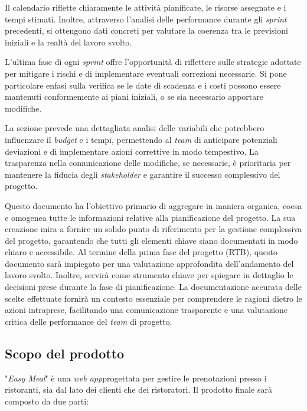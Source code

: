 \begin{itemize}
	      Il calendario riflette chiaramente le attività pianificate, le risorse assegnate
	      e i tempi stimati.
	      Inoltre, attraverso l'analisi delle performance durante gli \textit{sprint} precedenti,
	      si ottengono dati concreti per valutare la coerenza tra le previsioni iniziali
	      e la realtà del lavoro svolto.

	      L'ultima fase di ogni \textit{sprint} offre l'opportunità di riflettere sulle strategie
	      adottate per mitigare i rischi e di implementare eventuali correzioni necessarie.
	      Si pone particolare enfasi sulla verifica se le date di scadenza e i costi possono
	      essere mantenuti conformemente ai piani iniziali, o se sia necessario apportare modifiche.

	      La sezione prevede una dettagliata analisi delle variabili che potrebbero influenzare
	      il \textit{budget} e i tempi, permettendo al \textit{team} di anticipare potenziali deviazioni e di
	      implementare azioni correttive in modo tempestivo. La trasparenza nella comunicazione
	      delle modifiche, se necessarie, è prioritaria per mantenere la fiducia degli \textit{stakeholder}
	      e garantire il successo complessivo del progetto.
\end{itemize}
Questo documento ha l'obiettivo primario di aggregare in maniera organica, coesa e
omogenea tutte le informazioni relative alla pianificazione del progetto.
La sua creazione mira a fornire un solido punto di riferimento per la gestione complessiva del progetto,
garantendo che tutti gli elementi chiave siano documentati in modo chiaro e accessibile.
\newline
Al termine della prima fase del progetto (RTB), questo documento sarà impiegato per una valutazione
approfondita dell'andamento del lavoro svolto. Inoltre, servirà come strumento chiave per spiegare
in dettaglio le decisioni prese durante la fase di pianificazione.
La documentazione accurata delle scelte effettuate fornirà un contesto essenziale per comprendere
le ragioni dietro le azioni intraprese, facilitando una comunicazione trasparente e una
valutazione critica delle performance del \textit{team} di progetto.

\subsection{Scopo del prodotto}

"\textit{Easy Meal}" è una \textit{web app}\g progettata per gestire le
prenotazioni presso i ristoranti, sia dal lato dei clienti che dei ristoratori.
Il prodotto finale sarà composto da due parti:

